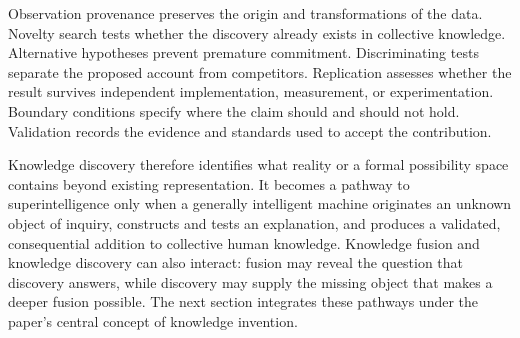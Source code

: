 Observation provenance preserves the origin and transformations of the data.
Novelty search tests whether the discovery already exists in collective
knowledge. Alternative hypotheses prevent premature commitment.
Discriminating tests separate the proposed account from competitors.
Replication assesses whether the result survives independent implementation,
measurement, or experimentation. Boundary conditions specify where the claim
should and should not hold. Validation records the evidence and standards used
to accept the contribution.

Knowledge discovery therefore identifies what reality or a formal possibility
space contains beyond existing representation. It becomes a pathway to
superintelligence only when a generally intelligent machine originates an
unknown object of inquiry, constructs and tests an explanation, and produces a
validated, consequential addition to collective human knowledge. Knowledge
fusion and knowledge discovery can also interact: fusion may reveal the
question that discovery answers, while discovery may supply the missing object
that makes a deeper fusion possible. The next section integrates these pathways
under the paper's central concept of knowledge invention.

